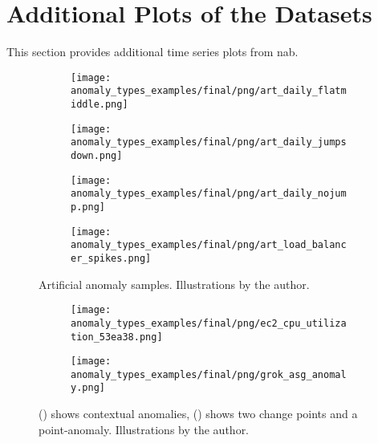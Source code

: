 \section{Additional Plots of the Datasets}\label{sect:additonal-plots-dataset}
This section provides additional time series plots from \gls{nab}.
\begin{figure}[htp!]
    \centering
    \begin{subfigure}[t]{.49\linewidth}
        \centering
        \texttt{[image: anomaly\_types\_examples/final/png/art\_daily\_flatmiddle.png]}
        \label{app-fig:art_daily_flatmiddle}
    \end{subfigure}
    \begin{subfigure}[t]{.49\linewidth}
        \centering
        \texttt{[image: anomaly\_types\_examples/final/png/art\_daily\_jumpsdown.png]}
        \label{app-fig:art_daily_jumpsdown}
    \end{subfigure}
    \begin{subfigure}[t]{.49\linewidth}
        \centering
        \texttt{[image: anomaly\_types\_examples/final/png/art\_daily\_nojump.png]}
        \label{app-fig:art_daily_nojump}
    \end{subfigure}
    \begin{subfigure}[t]{.49\linewidth}
        \centering
        \texttt{[image: anomaly\_types\_examples/final/png/art\_load\_balancer\_spikes.png]}
        \label{app-fig:art_load_balancer_spikes}
    \end{subfigure}
    \caption{Artificial anomaly samples. Illustrations by the author.}\label{app-fig:artificial-anomaly-types-nab}
\end{figure}
\begin{figure}[htp!]
    \centering
    \begin{subfigure}[t]{.49\linewidth}
        \centering
        \texttt{[image: anomaly\_types\_examples/final/png/ec2\_cpu\_utilization\_53ea38.png]}
        \label{app-fig:ec2_cpu_utilization_53ea38}
    \end{subfigure}
    \begin{subfigure}[t]{.49\linewidth}
        \centering
        \texttt{[image: anomaly\_types\_examples/final/png/grok\_asg\_anomaly.png]}
        \label{app-fig:grok_asg_anomaly}
    \end{subfigure}
    \caption[Contextual anomalies and change points]{() 
    shows contextual anomalies, () shows two
    change points and a point-anomaly. Illustrations by the author.}\label{fig:artificial-anomaly-types-nab}
\end{figure}
